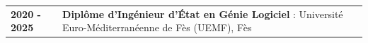 
\begin{scholarship}
    \begin{tabular}{l l}
        \textbf{2020 - 2025} & \textbf{Diplôme d'Ingénieur d'État en Génie Logiciel} : Université Euro-Méditerranéenne de Fès (UEMF), Fès \\
    \end{tabular}
\end{scholarship}
